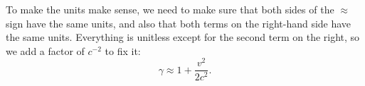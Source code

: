 To make the units make sense, we need to make sure that both sides of the $\approx$ sign have
the same units, and also that both terms on the right-hand side have the same units. Everything
is unitless except for the second term on the right, so we add a factor of $c^{-2}$ to fix it:
\begin{equation*}
  \gamma\approx1+\frac{v^2}{2c^2}.
\end{equation*}
